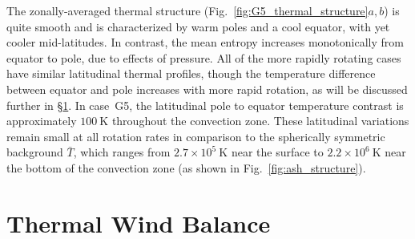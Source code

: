 The zonally-averaged thermal structure
(Fig.~\ref{fig:G5_thermal_structure}$a,b$) is quite smooth and is characterized by
warm poles and a cool equator, with yet cooler mid-latitudes.  
In contrast, the mean entropy increases monotonically from
equator to pole, due to effects of pressure.  All of the more rapidly rotating cases
have similar latitudinal thermal profiles, though the temperature
difference between equator and pole increases with more rapid
rotation, as will be discussed further in \S\ref{sec:thermal wind}.
In case~G5, the latitudinal pole to equator temperature contrast is approximately
$100~\mathrm{K}$ throughout the convection zone.  These latitudinal variations remain small
at all rotation rates in comparison to the spherically symmetric
background $\bar{T}$, which ranges from $2.7\times 10^5~\mathrm{K}$ near the surface to
$2.2\times 10^6~\mathrm{K}$ near the bottom of the convection zone (as
shown in Fig.~\ref{fig:ash_structure}).

 


\section{Thermal Wind Balance}
\label{sec:thermal wind}

